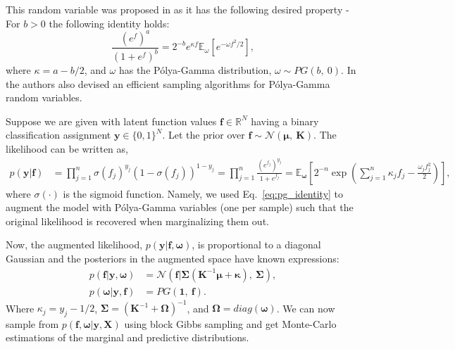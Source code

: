 \documentclass{article}
\def\Eqref#1{Eq.~\ref{#1}}
\newcommand{\normal}{\mathcal{N}}
\newcommand{\bld}[1]{\boldsymbol{#1}}
\def\rf{{f}}
\def\rvf{{\mathbf{f}}}
\def\rvy{{\mathbf{y}}}
\def\rmK{{\mathbf{K}}}
\def\rmX{{\mathbf{X}}}
\def\sR{{\mathbb{R}}}
\newcommand{\E}{\mathbb{E}}
\newcommand{\pg}{P\'olya-Gamma }
\newcommand{\K}{\mathbf{K}}
\newcommand{\rvmu}{\bld{\mathbf{\mu}}}
\newcommand{\rvomega}{\bld{\mathbf{\omega}}}
\newcommand{\rvkappa}{\bld{\mathbf{\kappa}}}
\newcommand{\rmOmega}{\mathbf{\Omega}}
\newcommand{\rmSigma}{\mathbf{\Sigma}}
\begin{document}
This random variable was proposed in \cite{polya_gamma} as it has the following desired property - For $b > 0$ the following identity holds:
\begin{equation}\label{eq:pg_identity}
    \frac{(e^{\rf})^a}{(1+e^{\rf})^b}=2^{-b}e^{\kappa\rf}\mathbb{E}_{\omega}[e^{-\omega\rf^2/2}],
\end{equation}
where $\kappa=a-b/2$, and $\omega$ has the \pg distribution, $\omega\sim PG(b,~0)$. In \cite{polya_gamma} the authors also devised an efficient sampling algorithms for \pg random variables.

Suppose we are given with latent function values $\rvf \in \sR^N$ having a binary classification assignment $\rvy \in \{0, 1\}^N$. Let the prior over $\rvf \sim \normal(\rvmu,~\rmK)$. The likelihood can be written as, 
\begin{equation}\label{eq:node_likelihood}
    \begin{aligned}
    p(\rvy | \rvf) &= \prod_{j = 1}^{n} \sigma(f_j)^{y_j} (1 - \sigma(f_j))^{1 - y_j} = \prod_{j = 1}^{n} \frac{(e^{f_j})^{y_j}}{1 + e^{f_j}}=\E_{\rvomega}\left[2^{-n}\exp\left(\sum_{j=1}^{n} \kappa_j f_j- \frac{\omega_j f_j^2}{2} \right)\right],
    \end{aligned}
\end{equation}
where $\sigma(\cdot)$ is the sigmoid function. Namely, we used \Eqref{eq:pg_identity} to augment the model with \pg variables (one per sample) such that the original likelihood is recovered when marginalizing them out. 

Now, the augmented likelihood, $p(\rvy | \rvf, \rvomega)$, is proportional to a diagonal Gaussian and the posteriors in the augmented space have known expressions:
\begin{equation}\label{eq:posterior_dist}
    \begin{aligned}
        p(\rvf | \rvy, \rvomega) &= \normal(\rvf | \rmSigma(\K^{-1}\rvmu + \rvkappa),~\rmSigma),\\
        p(\rvomega | \rvy, \rvf) &= PG(\bld{1},~\rvf).
    \end{aligned}
\end{equation}
Where $\kappa_j = y_j - 1/2$, $\bld{\Sigma} = (\K^{-1} + \rmOmega)^{-1}$, and $\rmOmega = diag(\rvomega)$. We can now sample from $p(\rvf,\rvomega|\rvy, \rmX)$ using block Gibbs sampling and get Monte-Carlo estimations of the marginal and predictive distributions.
\end{document}
